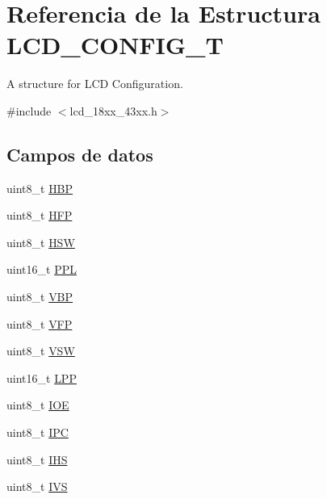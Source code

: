 \hypertarget{struct_l_c_d___c_o_n_f_i_g___t}{}\section{Referencia de la Estructura L\+C\+D\+\_\+\+C\+O\+N\+F\+I\+G\+\_\+T}
\label{struct_l_c_d___c_o_n_f_i_g___t}


A structure for L\+CD Configuration.  




{\ttfamily \#include $<$lcd\+\_\+18xx\+\_\+43xx.\+h$>$}

\subsection*{Campos de datos}
\begin{DoxyCompactItemize}
\item 
uint8\+\_\+t \hyperlink{struct_l_c_d___c_o_n_f_i_g___t_a8e457c625105ebf5412f0068fa527792}{H\+BP}
\item 
uint8\+\_\+t \hyperlink{struct_l_c_d___c_o_n_f_i_g___t_a112e61ab46db6540b52169064d586516}{H\+FP}
\item 
uint8\+\_\+t \hyperlink{struct_l_c_d___c_o_n_f_i_g___t_ac0cbd6f77d175aae7895c50dd52dacbc}{H\+SW}
\item 
uint16\+\_\+t \hyperlink{struct_l_c_d___c_o_n_f_i_g___t_a34a9e7f684990f3d8c924b0b7ad060b1}{P\+PL}
\item 
uint8\+\_\+t \hyperlink{struct_l_c_d___c_o_n_f_i_g___t_a2933e02b3716a8b2121c0f2dec2e3834}{V\+BP}
\item 
uint8\+\_\+t \hyperlink{struct_l_c_d___c_o_n_f_i_g___t_ad1c0cbe37f4472325d18a677fca84e47}{V\+FP}
\item 
uint8\+\_\+t \hyperlink{struct_l_c_d___c_o_n_f_i_g___t_a6d83cd61df80c52bbb771d3ff818d6b7}{V\+SW}
\item 
uint16\+\_\+t \hyperlink{struct_l_c_d___c_o_n_f_i_g___t_a02f7f26cd8ac7e2ede0206168401e386}{L\+PP}
\item 
uint8\+\_\+t \hyperlink{struct_l_c_d___c_o_n_f_i_g___t_a40a2b55f4c43d96272aeddeb3c9033b9}{I\+OE}
\item 
uint8\+\_\+t \hyperlink{struct_l_c_d___c_o_n_f_i_g___t_a7225dd1a0e385af9f28af9e1cbbfa43c}{I\+PC}
\item 
uint8\+\_\+t \hyperlink{struct_l_c_d___c_o_n_f_i_g___t_a631c2cdd59463385b8d5b7c1e96a28d0}{I\+HS}
\item 
uint8\+\_\+t \hyperlink{struct_l_c_d___c_o_n_f_i_g___t_ab27d9dd9f53968c1a7aeada3f1c27aaf}{I\+VS}

\end{DoxyCompactItemize}
